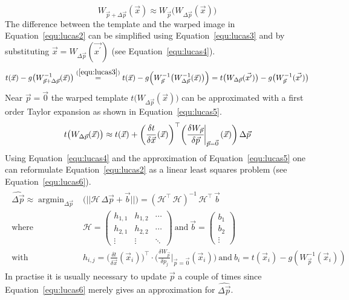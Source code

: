 \documentclass[12pt,a4paper,oneside,openright]{book}
\newcommand{\equ}[1]{Equation~\ref{equ:#1}}
\begin{document}
\begin{CJK}{UTF8}{}
\begin{equation}
  W_{\vec{p}+\Delta\vec{p}}(\vec{x})\approx W_{\vec{p}}\big(W_{\Delta\vec{p}}(\vec{x})\big)
\end{equation}
The difference between the template and the warped image in \equ{lucas2} can be simplified using \equ{lucas3} and by substituting $\vec{x}=W_{\Delta\vec{p}}(\vec{x^\prime})$ (see \equ{lucas4}).
\begin{equation}\label{equ:lucas4}
  t(\vec{x})-g\big(W_{\vec{p}+\Delta\vec{p}}^{-1}(\vec{x})\big)\overset{(\ref{equ:lucas3})}{=}
  t(\vec{x})-g\Big(W_{\vec{p}}^{-1}\big(W_{\Delta\vec{p}}^{-1}(\vec{x})\big)\Big)=
  t\big(W_{\Delta\vec{p}}(\vec{x^\prime})\big)-g\big(W_{\vec{p}}^{-1}(\vec{x^\prime})\big)
\end{equation}
Near $\vec{p}=\vec{0}$ the warped template $t\big(W_{\Delta\vec{p}}(\vec{x})\big)$ can be approximated with a first order Taylor expansion as shown in \equ{lucas5}.
\begin{equation}\label{equ:lucas5}
  t\big(W_{\Delta\vec{p}}(\vec{x})\big)\approx t(\vec{x})+\bigg(\cfrac{\delta t}{\delta\vec{x}}\,(\vec{x})\bigg)^\top\bigg(\cfrac{\delta W_{\vec{p}}}{\delta\vec{p}}\bigg|_{\vec{p}=\vec{0}}\,(\vec{x})\bigg)\,\Delta\vec{p}
\end{equation}
Using \equ{lucas4} and the approximation of \equ{lucas5} one can reformulate \equ{lucas2} as a linear least squares problem (see \equ{lucas6}).
\begin{align}\label{equ:lucas6}
  \begin{split}
    \widehat{\Delta\vec{p}}\approx\mathop{\operatorname{argmin}}_{\Delta\vec{p}}&\big(||\mathcal{H}\,\Delta\vec{p}+\vec{b}||\big)=(\mathcal{H}^\top\,\mathcal{H})^{-1}\,\mathcal{H}^\top\,\vec{b}\\
    \mathrm{where\ }&\mathcal{H}=\begin{pmatrix}h_{1,1}&h_{1,2}&\cdots\\h_{2,1}&h_{2,2}&\cdots\\\vdots&\vdots&\ddots\end{pmatrix}\mathrm{\ and\ }\vec{b}=\begin{pmatrix}b_1\\b_2\\\vdots\end{pmatrix}\\
    \mathrm{with\ }&\displaystyle h_{i,j}=\bigg(\frac{\delta t}{\delta \vec{x}}(\vec{x}_i)\bigg)^\top\cdot\bigg(\frac{\delta W_{\vec{p}}}{\delta p_j}\bigg|_{\vec{p}=\vec{0}}(\vec{x}_i)\bigg)\mathrm{\ and\ }b_i=t(\vec{x}_i)-g(W^{-1}_{\vec{p}}(\vec{x}_i))
  \end{split}
\end{align}
In practise it is usually necessary to update $\vec{p}$ a couple of times since \equ{lucas6} merely gives an approximation for $\widehat{\Delta\vec{p}}$.


\end{CJK}
\end{document}
